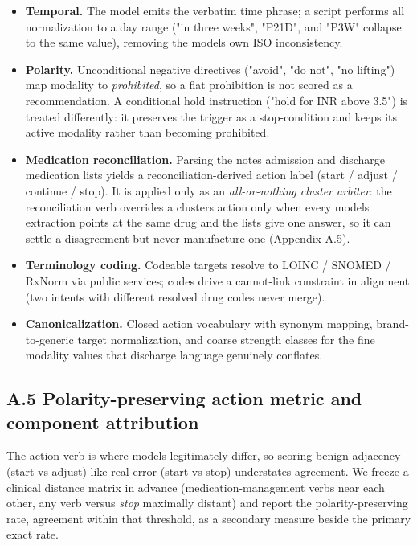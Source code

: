 \begin{itemize}
\tightlist
\item
  \textbf{Temporal.} The model emits the verbatim time phrase; a script performs all normalization to a day range ("in three weeks", "P21D", and "P3W" collapse to the same value), removing the model\textquotesingle s own ISO inconsistency.
\item
  \textbf{Polarity.} Unconditional negative directives ("avoid", "do not", "no lifting") map modality to \emph{prohibited}, so a flat prohibition is not scored as a recommendation. A conditional hold instruction ("hold for INR above 3.5") is treated differently: it preserves the trigger as a stop-condition and keeps its active modality rather than becoming prohibited.
\item
  \textbf{Medication reconciliation.} Parsing the note\textquotesingle s admission and discharge medication lists yields a reconciliation-derived action label (start / adjust / continue / stop). It is applied only as an \emph{all-or-nothing cluster arbiter}: the reconciliation verb overrides a cluster\textquotesingle s action only when every model\textquotesingle s extraction points at the same drug and the lists give one answer, so it can settle a disagreement but never manufacture one (Appendix A.5).
\item
  \textbf{Terminology coding.} Codeable targets resolve to LOINC / SNOMED / RxNorm via public services; codes drive a cannot-link constraint in alignment (two intents with different resolved drug codes never merge).
\item
  \textbf{Canonicalization.} Closed action vocabulary with synonym mapping, brand-to-generic target normalization, and coarse strength classes for the fine modality values that discharge language genuinely conflates.
\end{itemize}

\subsection{A.5 Polarity-preserving action metric and component attribution}\label{a.5-polarity-preserving-action-metric-and-component-attribution}

The action verb is where models legitimately differ, so scoring benign adjacency (start vs adjust) like real error (start vs stop) understates agreement. We freeze a clinical distance matrix in advance (medication-management verbs near each other, any verb versus \emph{stop} maximally distant) and report the polarity-preserving rate, agreement within that threshold, as a secondary measure beside the primary exact rate.

